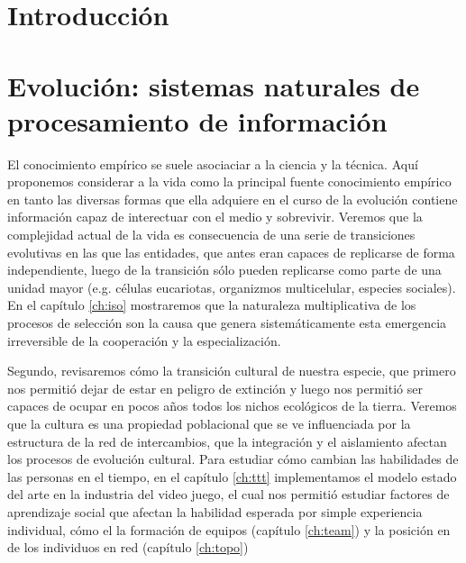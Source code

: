 \documentclass[a4paper,10pt]{book}
\makeatletter
\renewcommand{\mainmatter}{\cleardoublepage\@mainmattertrue}
\theoremstyle{definition}
\makeatother
\begin{document}
\chapter{Introducción}

\mainmatter



\chapter{Evolución: sistemas naturales de procesamiento de información} \label{ch:evo}

El conocimiento empírico se suele asociaciar a la ciencia y la técnica.
Aquí proponemos considerar a la vida como la principal fuente conocimiento empírico en tanto las diversas formas que ella adquiere en el curso de la evolución contiene información capaz de interectuar con el medio y sobrevivir.
Veremos que la complejidad actual de la vida es consecuencia de una serie de transiciones evolutivas en las que las entidades, que antes eran capaces de replicarse de forma independiente, luego de la transición sólo pueden replicarse como parte de una unidad mayor (e.g. células eucariotas, organizmos multicelular, especies sociales).
En el capítulo \ref{ch:iso} mostraremos que la naturaleza multiplicativa de los procesos de selección son la causa que genera sistemáticamente esta emergencia irreversible de la cooperación y la especialización.


Segundo, revisaremos cómo la transición cultural de nuestra especie, que primero nos permitió dejar de estar en peligro de extinción y luego nos permitió ser capaces de ocupar en pocos años todos los nichos ecológicos de la tierra.
Veremos que la cultura es una propiedad poblacional que se ve influenciada por la estructura de la red de intercambios, que la integración y el aislamiento afectan los procesos de evolución cultural.%
Para estudiar cómo cambian las habilidades de las personas en el tiempo, en el capítulo \ref{ch:ttt} implementamos el modelo estado del arte en la industria del video juego, el cual nos permitió estudiar factores de aprendizaje social que afectan la habilidad esperada por simple experiencia individual, cómo el la formación de equipos (capítulo \ref{ch:team}) y la posición en de los individuos en red (capítulo \ref{ch:topo})
\end{document}
